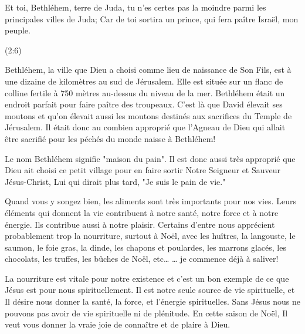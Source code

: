 

\epigraph{%
Et toi, Bethléhem, terre de Juda, tu n’es certes pas la moindre parmi les principales villes de Juda; Car de toi sortira un prince, qui fera paître Israël, mon peuple.}{(2:6)}

Bethléhem, la ville que Dieu a choisi comme lieu de naissance de Son Fils, est à une dizaine de kilomètres au sud de Jérusalem. Elle est située sur un flanc de colline fertile à 750 mètres au-dessus du niveau de la mer. Bethléhem était un endroit parfait pour faire paître des troupeaux. C'est là que David élevait ses moutons et qu'on élevait aussi les moutons destinés aux sacrifices du Temple de Jérusalem. Il était donc au combien approprié que l'Agneau de Dieu qui allait être sacrifié pour les péchés du monde naisse à Bethléhem!

Le nom Bethléhem signifie "maison du pain". Il est donc aussi très approprié que Dieu ait choisi ce petit village pour en faire sortir Notre Seigneur et Sauveur Jésus-Christ, Lui qui dirait plus tard, "Je suis le pain de vie."

Quand vous y songez bien, les aliments sont très importants pour nos vies. Leurs éléments qui donnent la vie contribuent à notre santé, notre force et à notre énergie. Ils contribue aussi à notre plaisir. Certains d'entre nous apprécient probablement trop la nourriture, surtout à Noël, avec les huîtres, la langouste, le saumon, le foie gras, la dinde, les chapons et poulardes, les marrons glacés, les chocolats, les truffes, les bûches de Noël, etc… … je commence déjà à saliver!

La nourriture est vitale pour notre existence et c'est un bon exemple de ce que Jésus est pour nous spirituellement. Il est notre seule source de vie spirituelle, et Il désire nous donner la santé, la force, et l'énergie spirituelles. Sans Jésus nous ne pouvons pas avoir de vie spirituelle ni de plénitude. En cette saison de Noël, Il veut vous donner la vraie joie de connaître et de plaire à Dieu.



